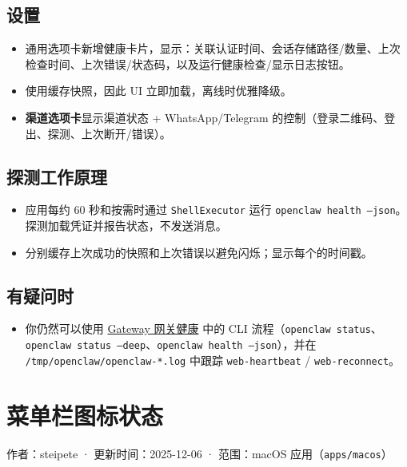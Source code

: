 \subsection{设置}


\begin{itemize}
  \item 通用选项卡新增健康卡片，显示：关联认证时间、会话存储路径/数量、上次检查时间、上次错误/状态码，以及运行健康检查/显示日志按钮。
  \item 使用缓存快照，因此 UI 立即加载，离线时优雅降级。
  \item \textbf{渠道选项卡}显示渠道状态 + WhatsApp/Telegram 的控制（登录二维码、登出、探测、上次断开/错误）。
\end{itemize}


\subsection{探测工作原理}


\begin{itemize}
  \item 应用每约 60 秒和按需时通过 \texttt{ShellExecutor} 运行 \texttt{openclaw health --json}。探测加载凭证并报告状态，不发送消息。
  \item 分别缓存上次成功的快照和上次错误以避免闪烁；显示每个的时间戳。
\end{itemize}


\subsection{有疑问时}


\begin{itemize}
  \item 你仍然可以使用 \href{/gateway/health}{Gateway 网关健康} 中的 CLI 流程（\texttt{openclaw status}、\texttt{openclaw status --deep}、\texttt{openclaw health --json}），并在 \texttt{/tmp/openclaw/openclaw-*.log} 中跟踪 \texttt{web-heartbeat} / \texttt{web-reconnect}。
\end{itemize}



\clearpage

\section{菜单栏图标状态}


作者：steipete · 更新时间：2025-12-06 · 范围：macOS 应用（\texttt{apps/macos}）

